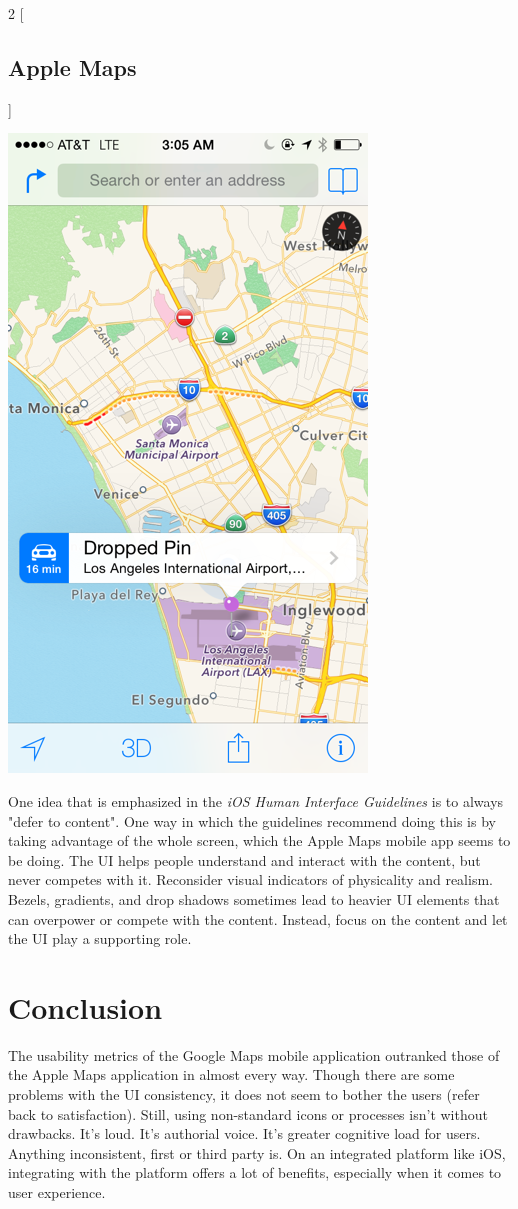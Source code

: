 \documentclass[a4paper; 11pt]{article}
\begin{document}
\clearpage
\begin{multicols}{2}
[
\subsection{Apple Maps}
]
\par
\noindent
\includegraphics[width=.5\textwidth]{apple-maps.png}
\par
\noindent
One idea that is emphasized in the \textit{iOS Human Interface Guidelines} is to always "defer to content".\cite{Apple} One way in which the guidelines recommend doing this is by taking advantage of the whole screen, which the Apple Maps mobile app seems to be doing. The UI helps people understand and interact with the content, but never competes with it. Reconsider visual indicators of physicality and realism. Bezels, gradients, and drop shadows sometimes lead to heavier UI elements that can overpower or compete with the content. Instead, focus on the content and let the UI play a supporting role.




\end{multicols}
\clearpage
\section{Conclusion}
The usability metrics of the Google Maps mobile application outranked those of the Apple Maps application in almost every way. Though there are some problems with the UI consistency, it does not seem to bother the users (refer back to satisfaction). Still, using non-standard icons or processes isn't without drawbacks. It's loud. It's authorial voice. It's greater cognitive load for users. Anything inconsistent, first or third party is. On an integrated platform like iOS, integrating with the platform offers a lot of benefits, especially when it comes to user experience.
\end{document}
